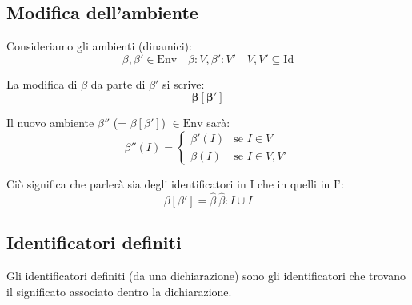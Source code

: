 \subsection{Modifica dell'ambiente}
Consideriamo gli ambienti (dinamici):
\[
    \beta, \beta' \in \mathrm{Env} \quad \beta : V, \beta' : V' \quad V, V' \subseteq \mathrm{Id}
\]

La modifica di $\beta$ da parte di $\beta'$ si scrive:
\[
    \mathbf{\beta[\beta']}
\]

Il nuovo ambiente $\beta''$ (= $\beta[\beta']$) $\in \mathrm{Env}$ sarà:
\[
    \beta''(I) = 
    \begin{cases} 
        \beta'(I) & \text{se } I \in V \\
        \beta(I)  & \text{se } I \in V, V' 
    \end{cases}
\]

Ciò significa che parlerà sia degli identificatori in I che in quelli in I':
\[
    \beta[\beta'] = \hat{\beta} \ \hat{\beta}: I \cup I
\]


\subsection{Identificatori definiti}
Gli identificatori definiti (da una dichiarazione) sono gli identificatori che trovano il significato associato dentro la dichiarazione.


